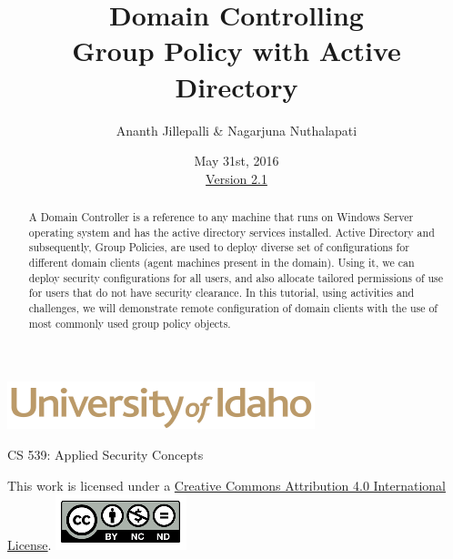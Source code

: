 \documentclass[12pt]{extarticle}
\begin{document}
\title{ Domain Controlling \\ \large Group Policy with Active Directory}
\author{Ananth Jillepalli \& Nagarjuna Nuthalapati}
\date{May 31st, 2016 \\ \hyperref[changelog]{Version 2.1}} %
\renewcommand{\abstractname}{Summary}
\begin{titlepage}
\maketitle
{}
\begin{center}
\includegraphics[scale=.5]{UofI}

\large{CS 539: Applied Security Concepts}

\vskip 40pt

\end{center}
\begin{abstract}
A Domain Controller is a reference to any machine that runs on Windows Server operating system and has the active directory services installed. Active Directory and subsequently, Group Policies, are used to deploy diverse set of configurations for different domain clients (agent machines present in the domain). Using it, we can deploy security configurations for all users, and also allocate tailored permissions of use for users that do not have security clearance. In this tutorial, using activities and challenges, we will demonstrate remote configuration of domain clients with the use of most commonly used group policy objects.   
\end{abstract}


\vfill
\begin{center}
This work is licensed under a \href{http://creativecommons.org/licenses/by/4.0/}{Creative Commons Attribution 4.0 International License}.
\vskip 10pt
\includegraphics[scale=.5]{cc}
\end{center}

\end{titlepage}


\pagebreak
\tableofcontents
\end{document}
